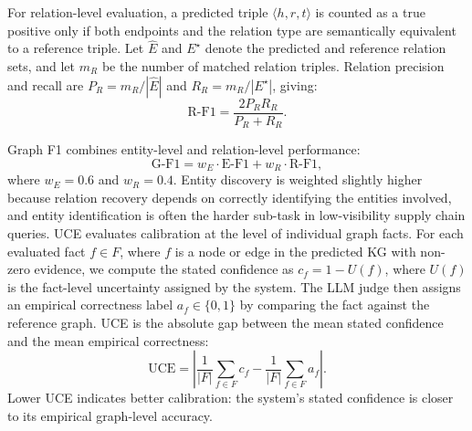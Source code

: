 \documentclass{article}
\begin{document}
For relation-level evaluation, a predicted triple $\langle h,r,t\rangle$ is counted as a true positive only if both endpoints and the relation type are semantically equivalent to a reference triple. Let $\hat{E}$ and $E^\star$ denote the predicted and reference relation sets, and let $m_R$ be the number of matched relation triples. Relation precision and recall are $P_R=m_R/|\hat{E}|$ and $R_R=m_R/|E^\star|$, giving:
\begin{equation}
\text{R-F1}
=
\frac{2P_R R_R}{P_R + R_R}.
\end{equation}

Graph F1 combines entity-level and relation-level performance:
\begin{equation}
\text{G-F1}
=
w_E \cdot \text{E-F1}
+
w_R \cdot \text{R-F1},
\end{equation}
where $w_E=0.6$ and $w_R=0.4$. Entity discovery is weighted slightly higher because relation recovery depends on correctly identifying the entities involved, and entity identification is often the harder sub-task in low-visibility supply chain queries.
UCE evaluates calibration at the level of individual graph facts. For each evaluated fact $f \in F$, where $f$ is a node or edge in the predicted KG with non-zero evidence, we compute the stated confidence as $c_f = 1-U(f)$, where $U(f)$ is the fact-level uncertainty assigned by the system. The LLM judge then assigns an empirical correctness label $a_f \in \{0,1\}$ by comparing the fact against the reference graph. UCE is the absolute gap between the mean stated confidence and the mean empirical correctness:
\begin{equation}
\text{UCE}
=
\left|
\frac{1}{|F|}\sum_{f \in F} c_f
-
\frac{1}{|F|}\sum_{f \in F} a_f
\right|.
\end{equation}
Lower UCE indicates better calibration: the system's stated confidence is closer to its empirical graph-level accuracy.
\end{document}
